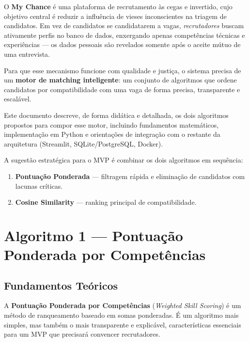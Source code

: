 \documentclass[12pt,a4paper]{article}
\begin{document}
O \textbf{My Chance} é uma plataforma de recrutamento às cegas e invertido, cujo objetivo central é
reduzir a influência de vieses inconscientes na triagem de candidatos. Em vez de candidatos
se candidatarem a vagas, \emph{recrutadores} buscam ativamente perfis no banco de dados,
enxergando apenas competências técnicas e experiências — os dados pessoais são revelados
somente após o aceite mútuo de uma entrevista.

Para que esse mecanismo funcione com qualidade e justiça, o sistema precisa de um
\textbf{motor de matching inteligente}: um conjunto de algoritmos que ordene candidatos por
compatibilidade com uma vaga de forma precisa, transparente e escalável.

Este documento descreve, de forma didática e detalhada, os dois algoritmos propostos para
compor esse motor, incluindo fundamentos matemáticos, implementação em Python e
orientações de integração com o restante da arquitetura (Streamlit, SQLite/PostgreSQL,
Docker).

\begin{infobox}
A sugestão estratégica para o MVP é combinar os dois algoritmos em sequência:
\begin{enumerate}
  \item \textbf{Pontuação Ponderada} — filtragem rápida e eliminação de candidatos com lacunas críticas.
  \item \textbf{Cosine Similarity} — ranking principal de compatibilidade.
\end{enumerate}
\end{infobox}

\newpage

\section{Algoritmo 1 — Pontuação Ponderada por Competências}

\subsection{Fundamentos Teóricos}

A \textbf{Pontuação Ponderada por Competências} (\textit{Weighted Skill Scoring}) é um método de ranqueamento baseado em somas ponderadas. É um algoritmo mais simples, mas também o mais transparente e explicável, características essenciais para um MVP que precisará convencer recrutadores.
\end{document}
